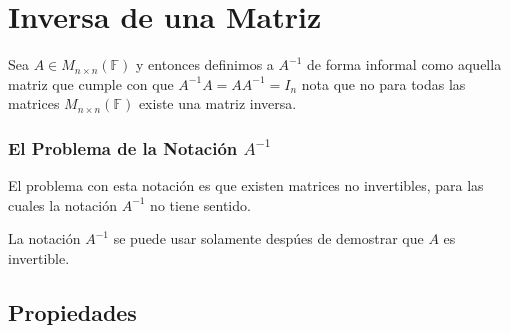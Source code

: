 \documentclass[12pt, fleqn]{report}                             %
\begin{document}
        \clearpage
        \section{Inversa de una Matriz}

            Sea $A \in M_{n \times n}(\mathbb{F})$ y entonces definimos a $A^{-1}$ 
            de forma informal como aquella matriz que cumple con que $A^{-1}A = AA^{-1} = I_{n}$
            nota que no para todas las matrices $M_{n \times n}(\mathbb{F})$ existe una matriz inversa.


           \subsubsection*{El Problema de la Notación $A^{-1}$}

           El problema con esta notación es que existen matrices no invertibles, para las cuales
           la notación $A^{-1}$ no tiene sentido.

           La notación $A^{-1}$ se puede usar solamente despúes de demostrar que $A$ es invertible.

            \clearpage
            \subsection{Propiedades}
\end{document}
